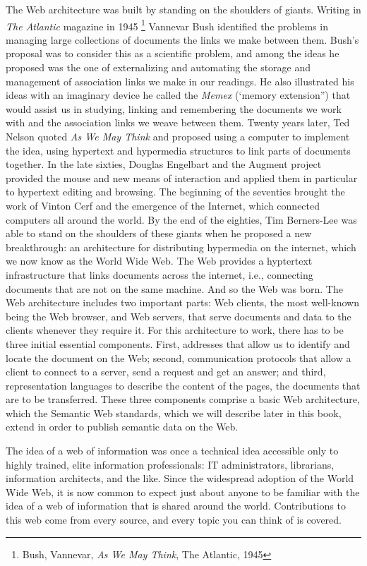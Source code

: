 The Web architecture was built by standing on the shoulders of giants. Writing in \emph{The Atlantic} magazine in 1945
\footnote{Bush, Vannevar, \textit{As We May Think}, The Atlantic, 1945} 
Vannevar Bush identified the problems in managing large collections of documents the links 
we make between them. Bush’s proposal was to consider this as a scientific problem, and among the ideas he proposed was the one of 
externalizing and automating 
the storage and management of association links we make in our readings. He also illustrated his ideas with an imaginary device he called 
the \textit{Memex} (‘memory extension”) that would assist us in studying, linking and remembering the documents we work with and the association 
links we weave between them. Twenty years later, Ted Nelson quoted \textit{As We May Think} and proposed using a computer to implement the idea, 
using hypertext and hypermedia structures to link parts of documents together. In the late sixties, Douglas Engelbart and the Augment project 
provided the mouse and new means of interaction and applied them in particular to hypertext editing and browsing. The beginning of the 
seventies brought the work of Vinton Cerf and the emergence of the Internet, which connected computers all around the world. By the 
end of the eighties, Tim Berners-Lee was able to stand on the shoulders of these giants when he proposed a new breakthrough: an architecture 
for distributing hypermedia on the internet, which we now know as the World Wide Web. The Web provides a hyptertext infrastructure that links 
documents across the internet, i.e., connecting documents that are not on the same machine. And so the Web was born. The Web architecture 
includes two important parts: Web clients, the most well-known being the Web browser, and  Web servers, that serve documents and data 
to the clients whenever they require it. For this architecture to work, there has to be three initial essential components. 
First, addresses that allow us to identify and locate the document on the Web; second, communication protocols that allow 
a client to connect to a server, send a request and get an answer; and third, representation languages to describe the 
content of the pages, the documents that are to be transferred. These three components comprise a basic Web architecture, 
which the Semantic Web standards, which we will describe later in this book, extend in order to publish semantic data on the Web.

The idea of a web of information was once a technical idea accessible only to highly trained, elite information professionals: 
IT administrators, librarians, information architects, and the like. Since the widespread adoption of the World Wide Web, 
it is now common to expect just about anyone to be familiar with the idea of a 
web of information that is shared around the world. Contributions to 
this web come from every source, and every topic you can think of is covered.

